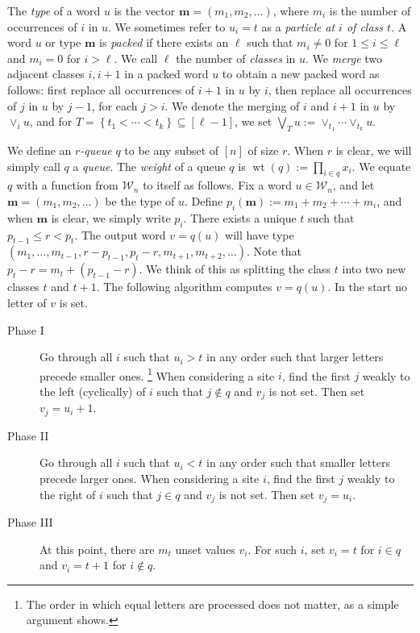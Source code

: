 \documentclass[reqno]{amsart}
\newcommand{\0}{\phantom{c}}
\newcommand{\merge}[1]{\vee_{#1}} %
\DeclareMathOperator{\wt}{wt} %
\newcommand{\mm}{\mathbf{m}}
\newcommand{\mcW}{\mathcal{W}}
\let\prodnonlimits\prod
\renewcommand{\prod}{\prodnonlimits\limits}
\newcommand{\set}[1]{\left\{ #1 \right\}}
\newcommand{\ive}[1]{\left[ #1 \right]}
\newcommand{\defn}[1]{{\color{darkred}\emph{#1}}} %
\theoremstyle{plain}
\theoremstyle{definition}
\numberwithin{equation}{section}
\begin{document}
The \defn{type} of a word $u$ is the vector $\mm = (m_1, m_2, \ldots)$, where $m_i$ is the number of occurrences of $i$ in $u$.
We sometimes refer to $u_i = t$ as a \defn{particle at $i$ of class $t$}.
A word $u$ or type $\mm$ is \defn{packed} if there exists an $\ell$ such that $m_i \neq 0$ for $1 \leq i \leq \ell$ and $m_i = 0$ for $i > \ell$.
We call $\ell$ the number of \defn{classes} in $u$.
We \defn{merge} two adjacent classes $i,i+1$ in a packed word $u$ to obtain a new packed word as follows: first replace all occurrences of $i+1$ in $u$ by $i$, then replace all occurrences of $j$ in $u$ by $j-1$, for each $j > i$.
We denote the merging of $i$ and $i+1$ in $u$ by $\merge{i} u$, and for $T = \set{t_1 < \cdots < t_k} \subseteq \ive{\ell-1}$, we set $\bigvee_T u := \merge{t_1} \cdots \merge{t_k} u$.

We define an \defn{$r$-queue} $q$ to be any subset of $\ive{n}$ of size $r$. When $r$ is clear, we will simply call $q$ a \defn{queue}.
The \defn{weight} of a queue $q$ is $\wt(q) := \prod_{i \in q} x_i$.
We equate $q$ with a function from $\mcW_n$ to itself as follows.
Fix a word $u \in \mcW_n$, and let $\mm = (m_1, m_2, \ldots)$ be the type of $u$.
Define $p_i(\mm) := m_1 + m_2 + \cdots + m_i$, and when $\mm$ is clear, we simply write $p_i$.
There exists a unique $t$ such that
$
p_{t-1} \leq r < p_t.
$
The output word $v = q(u)$ will have type $(m_1, \dots, m_{t-1}, r-p_{t-1}, p_{t}-r, m_{t+1}, m_{t+2}, \ldots)$.
Note that $p_{t} - r = m_{t} + (p_{t-1} - r)$.
We think of this as splitting the class $t$ into two new classes $t$ and $t+1$. The following algorithm computes $v = q(u)$. In the start no letter of $v$ is set.

\begin{description}
\item[Phase I]
  Go through all $i$ such that $u_i > t$ in any order such that larger letters precede smaller ones.%
  \footnote{The order in which equal letters are processed does not matter, as a simple argument shows.}
  When considering a site $i$, find the first $j$ weakly to the left (cyclically) of $i$ such that $j \notin q$ and $v_j$ is not set.
  Then set $v_j = u_i + 1$.

\item[Phase II]
  Go through all $i$ such that $u_i < t$ in any order such that smaller letters precede larger ones.
  When considering a site $i$, find the first $j$ weakly to the right of $i$ such that $j \in q$ and $v_j$ is not set.
  Then set $v_j = u_i$.

\item[Phase III]
  At this point, there are $m_t$ unset values $v_i$. For such $i$, set $v_i = t$ for $i \in q$ and $v_i = t+1$ for $i\notin q$.
\end{description}
\end{document}

